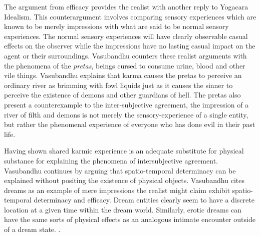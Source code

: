 The argument from efficacy provides the realist with another reply to Yogacara Idealism. This counterargument involves comparing sensory experiences which are known to be merely impressions with what are said to be normal sensory experiences. The normal sensory experiences will have clearly observable casual effects on the observer while the impressions have no lasting casual impact on the agent or their surroundings. \newline  Vasubandhu counters these realist arguments with the phenomena of the \textit{pretas}, beings cursed to consume urine, blood and other vile things. Vasubandhu explains that karma causes the pretas to perceive an ordinary river as brimming with fowl liquids just as it causes the sinner to perceive the existence of demons and other guardians of hell. The pretas also present a counterexample to the inter-subjective agreement, the impression of a river of filth and demons is not merely the sensory-experience of a single entity, but rather the phenomenal  experience of everyone who has done evil in their past life.  

Having shown shared karmic experience is an adequate substitute for physical substance for explaining the phenomena of intersubjective agreement.  Vasubandhu continues by arguing that spatio-temporal determinacy can be explained without positing the existence of physical objects. Vasubandhu cites dreams as an example of mere impressions the realist might claim exhibit spatio-temporal determinacy and efficacy. Dream entities clearly seem to have a discrete location at a given time within the dream world. Similarly, erotic dreams can have the same sorts of physical effects as an analogous intimate encounter outside of a dream state. \cite{siderits2007buddhism}. 
\newline

